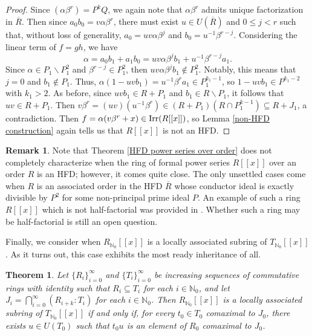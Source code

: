 \documentclass[12pt]{amsart}
\newtheorem{theorem}{Theorem}[section]
\theoremstyle{definition}
\newtheorem*{remark}{Remark}
\newcommand{\bNo}{{{\mathbb N}_0}}
\newcommand{\Rbar}{{\overline{R}}}
\newcommand{\Irr}{\textup{Irr}}
\begin{document}
\begin{proof}
    Since $(\alpha\beta^r)=P^kQ$, we again note that $\alpha\beta^r$ admits unique factorization in $\Rbar$. Then since $a_0b_0=v\alpha\beta^r$, there must exist $u\in U(\Rbar)$ and $0\leq j<r$ such that, without loss of generality, $a_0=uv\alpha\beta^j$ and $b_0=u^{-1}\beta^{r-j}$. Considering the linear term of $f=gh$, we have $$\alpha=a_0b_1+a_1b_0=uv\alpha\beta^jb_1+u^{-1}\beta^{r-j}a_1.$$
    Since $\alpha\in P_1\backslash P_1^2$ and $\beta^{r-j}\in P_1^2$, then $uv\alpha\beta^jb_1\notin P_1^2$. Notably, this means that $j=0$ and $b_1\notin P_1$. Thus, $\alpha(1-uvb_1)=u^{-1}\beta^ra_1\in P_1^{k_1-1}$, so $1-uvb_1\in P^{k_1-2}$ with $k_1>2$. As before, since $uvb_1\in R+P_1$ and $b_1\in R\backslash P_1$, it follows that $uv\in R+P_1$. Then $v\beta^r=(uv)(u^{-1}\beta^r)\in(R+P_1)(R\cap P_1^{k-1})\subseteq R+J_1$, a contradiction. Then $f=\alpha(v\beta^r+x)\in \Irr(R[[x]])$, so Lemma \ref{non-HFD construction} again tells us that $R[[x]]$ is not an HFD.
\end{proof}

\begin{remark}
    Note that Theorem \ref{HFD power series over order} does not completely characterize when the ring of formal power series $R[[x]]$ over an order $R$ is an HFD; however, it comes quite close. The only unsettled cases come when $R$ is an associated order in the HFD $\Rbar$ whose conductor ideal is exactly divisible by $P^2$ for some non-principal prime ideal $P$. An example of such a ring $R[[x]]$ which is not half-factorial was provided in \cite[Theorem 6.8]{radicalconductor}. Whether such a ring may be half-factorial is still an open question.
\end{remark}

Finally, we consider when $R_\bNo[[x]]$ is a locally associated subring of $T_\bNo[[x]]$. As it turns out, this case exhibits the most ready inheritance of all.

\begin{theorem}
    \label{la power series}
    Let $\{R_i\}_{i=0}^\infty$ and $\{T_i\}_{i=0}^\infty$ be increasing sequences of commutative rings with identity such that $R_i\subseteq T_i$ for each $i\in\bNo$, and let $J_i=\bigcap_{i=0}^\infty(R_{i+k}:T_i)$ for each $i\in\bNo$. Then $R_\bNo[[x]]$ is a locally associated subring of $T_\bNo[[x]]$ if and only if, for every $t_0\in T_0$ comaximal to $J_0$, there exists $u\in U(T_0)$ such that $t_0u$ is an element of $R_0$ comaximal to $J_0$.
\end{theorem}
\end{document}

